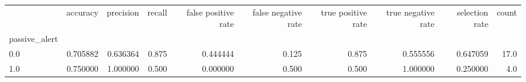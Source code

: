 \begin{tabular}{lrrrrrrrrr}
\toprule
{} &  accuracy &  precision &  recall &  false positive rate &  false negative rate &  true positive rate &  true negative rate &  selection rate &  count \\
passive\_alert &           &            &         &                      &                      &                     &                     &                 &        \\
\midrule
0.0           &  0.705882 &   0.636364 &   0.875 &             0.444444 &                0.125 &               0.875 &            0.555556 &        0.647059 &   17.0 \\
1.0           &  0.750000 &   1.000000 &   0.500 &             0.000000 &                0.500 &               0.500 &            1.000000 &        0.250000 &    4.0 \\
\bottomrule
\end{tabular}
